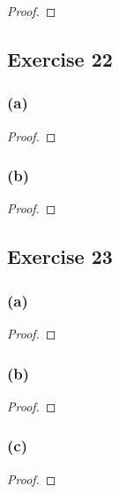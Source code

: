 \documentclass[14pt]{extarticle}
\begin{document}
\begin{proof}

\end{proof}

\subsection{Exercise 22}

\subsubsection{(a)}

\begin{proof}

\end{proof}

\subsubsection{(b)}

\begin{proof}

\end{proof}

\subsection{Exercise 23}

\subsubsection{(a)}

\begin{proof}

\end{proof}

\subsubsection{(b)}

\begin{proof}

\end{proof}

\subsubsection{(c)}

\begin{proof}

\end{proof}
\end{document}
